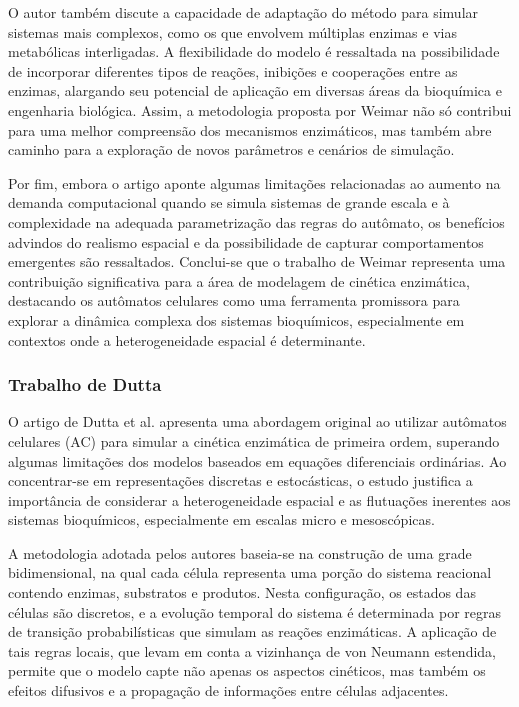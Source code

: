 \documentclass[12pt,oneside]{report}
\begin{document}
O autor também discute a capacidade de adaptação do método para simular sistemas mais complexos, como os que envolvem múltiplas enzimas e vias metabólicas interligadas. A flexibilidade do modelo é ressaltada na possibilidade de incorporar diferentes tipos de reações, inibições e cooperações entre as enzimas, alargando seu potencial de aplicação em diversas áreas da bioquímica e engenharia biológica. Assim, a metodologia proposta por Weimar não só contribui para uma melhor compreensão dos mecanismos enzimáticos, mas também abre caminho para a exploração de novos parâmetros e cenários de simulação.

Por fim, embora o artigo aponte algumas limitações relacionadas ao aumento na demanda computacional quando se simula sistemas de grande escala e à complexidade na adequada parametrização das regras do autômato, os benefícios advindos do realismo espacial e da possibilidade de capturar comportamentos emergentes são ressaltados. Conclui-se que o trabalho de Weimar \cite{weimar2002cellular} representa uma contribuição significativa para a área de modelagem de cinética enzimática, destacando os autômatos celulares como uma ferramenta promissora para explorar a dinâmica complexa dos sistemas bioquímicos, especialmente em contextos onde a heterogeneidade espacial é determinante.

\subsubsection{Trabalho de Dutta \citeyear{dutta2015generalized}}

O artigo de Dutta et al. \cite{dutta2015generalized} apresenta uma abordagem original ao utilizar autômatos celulares (AC) para simular a cinética enzimática de primeira ordem, superando algumas limitações dos modelos baseados em equações diferenciais ordinárias. Ao concentrar-se em representações discretas e estocásticas, o estudo justifica a importância de considerar a heterogeneidade espacial e as flutuações inerentes aos sistemas bioquímicos, especialmente em escalas micro e mesoscópicas.

A metodologia adotada pelos autores baseia-se na construção de uma grade bidimensional, na qual cada célula representa uma porção do sistema reacional contendo enzimas, substratos e produtos. Nesta configuração, os estados das células são discretos, e a evolução temporal do sistema é determinada por regras de transição probabilísticas que simulam as reações enzimáticas. A aplicação de tais regras locais, que levam em conta a vizinhança de von Neumann estendida, permite que o modelo capte não apenas os aspectos cinéticos, mas também os efeitos difusivos e a propagação de informações entre células adjacentes.
\end{document}
